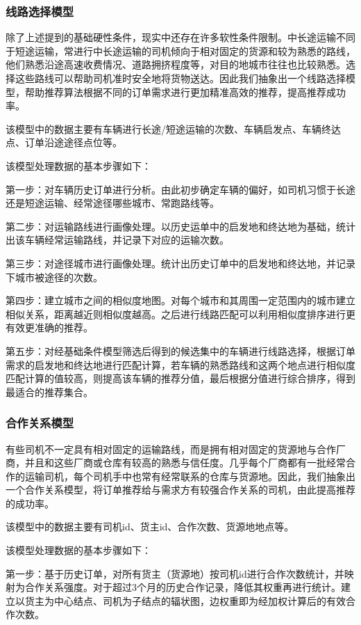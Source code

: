 \documentclass[UTF8]{ctexart}
\begin{document}
\begin{multicols}{2}
\subsubsection{线路选择模型}
除了上述提到的基础硬性条件，现实中还存在许多软性条件限制。中长途运输不同于短途运输，常进行中长途运输的司机倾向于相对固定的货源和较为熟悉的路线，他们熟悉沿途高速收费情况、道路拥挤程度等，对目的地城市往往也比较熟悉。选择这些路线可以帮助司机准时安全地将货物送达。因此我们抽象出一个线路选择模型，帮助推荐算法根据不同的订单需求进行更加精准高效的推荐，提高推荐成功率。

该模型中的数据主要有车辆进行长途/短途运输的次数、车辆启发点、车辆终达点、订单沿途途径点位等。

该模型处理数据的基本步骤如下：

第一步：对车辆历史订单进行分析。由此初步确定车辆的偏好，如司机习惯于长途还是短途运输、经常途径哪些城市、常跑路线等。

第二步：对运输路线进行画像处理。以历史运单中的启发地和终达地为基础，统计出该车辆经常运输路线，并记录下对应的运输次数。

第三步：对途径城市进行画像处理。统计出历史订单中的启发地和终达地，并记录下城市被途径的次数。

第四步：建立城市之间的相似度地图。对每个城市和其周围一定范围内的城市建立相似关系，距离越近则相似度越高。之后进行线路匹配可以利用相似度排序进行更有效更准确的推荐。

第五步：对经基础条件模型筛选后得到的候选集中的车辆进行线路选择，根据订单需求的启发地和终达地进行匹配计算，若车辆的熟悉路线和这两个地点进行相似度匹配计算的值较高，则提高该车辆的推荐分值，最后根据分值进行综合排序，得到最适合的推荐集合。

\subsubsection{合作关系模型}
有些司机不一定具有相对固定的运输路线，而是拥有相对固定的货源地与合作厂商，并且和这些厂商或仓库有较高的熟悉与信任度。几乎每个厂商都有一批经常合作的运输司机，每个司机手中也常有经常联系的仓库与货源地。因此，我们抽象出一个合作关系模型，将订单推荐给与需求方有较强合作关系的司机，由此提高推荐的成功率。

该模型中的数据主要有司机id、货主id、合作次数、货源地地点等。

该模型处理数据的基本步骤如下：

第一步：基于历史订单，对所有货主（货源地）按司机id进行合作次数统计，并映射为合作关系强度。对于超过3个月的历史合作记录，降低其权重再进行统计。建立以货主为中心结点、司机为子结点的辐状图，边权重即为经加权计算后的有效合作次数。


\end{multicols}
\end{document}
